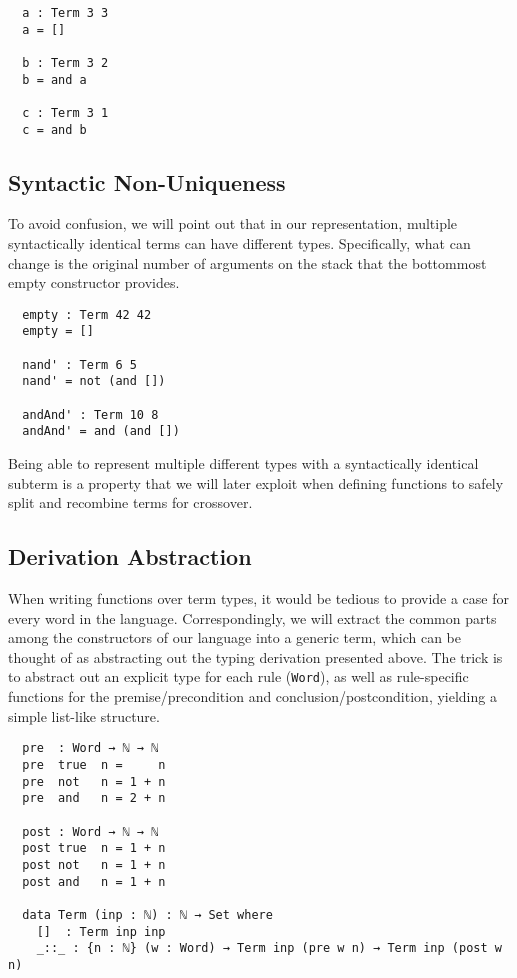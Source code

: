 \documentclass[runningheads,a4paper]{llncs}
\begin{document}
\begin{verbatim}
  a : Term 3 3
  a = []

  b : Term 3 2
  b = and a

  c : Term 3 1
  c = and b
\end{verbatim}

\subsection{Syntactic Non-Uniqueness}

To avoid confusion, we will point out that in our representation,
multiple syntactically identical terms can have different
types. Specifically, what can change is the original number of
arguments on the stack that the bottommost empty constructor provides.

\begin{verbatim}
  empty : Term 42 42
  empty = []

  nand' : Term 6 5
  nand' = not (and [])

  andAnd' : Term 10 8
  andAnd' = and (and [])
\end{verbatim}

Being able to represent multiple different types with a
syntactically identical subterm is a property that we will later
exploit when defining functions to safely split and recombine terms
for crossover.

\subsection{Derivation Abstraction}

When writing functions over term types, it would be tedious to provide
a case for every word in the language. Correspondingly, we will
extract the common parts among the constructors of our language into a
generic term, which can be thought of as abstracting out the typing
derivation presented above. The trick is to abstract out an explicit
type for each rule (\texttt{Word}), as well as rule-specific functions
for the premise/precondition and conclusion/postcondition, yielding a
simple list-like structure.

\begin{verbatim}
  pre  : Word → ℕ → ℕ
  pre  true  n =     n
  pre  not   n = 1 + n
  pre  and   n = 2 + n

  post : Word → ℕ → ℕ
  post true  n = 1 + n
  post not   n = 1 + n
  post and   n = 1 + n

  data Term (inp : ℕ) : ℕ → Set where
    []  : Term inp inp
    _::_ : {n : ℕ} (w : Word) → Term inp (pre w n) → Term inp (post w n)
\end{verbatim}
\end{document}
